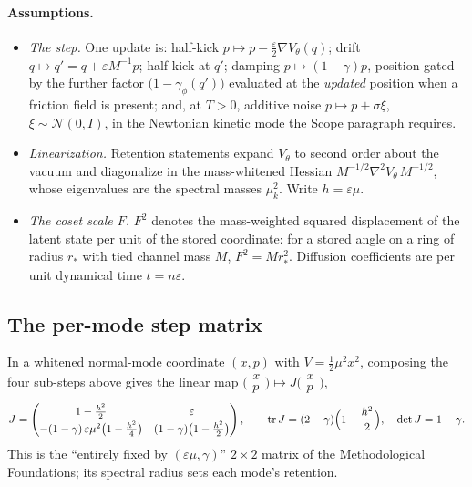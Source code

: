 \documentclass{article}
\begin{document}
\paragraph{Assumptions.}
\begin{itemize}
\item \emph{The step.} One update is: half-kick $p\mapsto p-\tfrac{\varepsilon}{2}\nabla V_\theta(q)$; drift $q\mapsto q'=q+\varepsilon M^{-1}p$; half-kick at $q'$; damping $p\mapsto(1-\gamma)p$, position-gated by the further factor $\bigl(1-\gamma_\phi(q')\bigr)$ evaluated at the \emph{updated} position when a friction field is present; and, at $T>0$, additive noise $p\mapsto p+\sigma\xi$, $\xi\sim\mathcal N(0,I)$, in the Newtonian kinetic mode the Scope paragraph requires.
\item \emph{Linearization.} Retention statements expand $V_\theta$ to second order about the vacuum and diagonalize in the mass-whitened Hessian $M^{-1/2}\nabla^2V_\theta\,M^{-1/2}$, whose eigenvalues are the spectral masses $\mu_k^2$. Write $h=\varepsilon\mu$.
\item \emph{The coset scale $F$.} $F^2$ denotes the mass-weighted squared displacement of the latent state per unit of the stored coordinate: for a stored angle on a ring of radius $r_*$ with tied channel mass $M$, $F^2=M r_*^2$. Diffusion coefficients are per unit dynamical time $t=n\varepsilon$.
\end{itemize}

\subsection{The per-mode step matrix}\label{app:deriv:1} In a whitened normal-mode coordinate $(x,p)$ with $V=\tfrac12\mu^2x^2$, composing the four sub-steps above gives the linear map $\bigl(\begin{smallmatrix}x\\p\end{smallmatrix}\bigr)\mapsto J\bigl(\begin{smallmatrix}x\\p\end{smallmatrix}\bigr)$,
\[
J=\begin{pmatrix}1-\tfrac{h^2}{2} & \varepsilon\\[2pt] -(1-\gamma)\,\varepsilon\mu^2\bigl(1-\tfrac{h^2}{4}\bigr) & (1-\gamma)\bigl(1-\tfrac{h^2}{2}\bigr)\end{pmatrix},
\qquad
\operatorname{tr}J=(2-\gamma)\Bigl(1-\frac{h^2}{2}\Bigr),\quad \det J=1-\gamma .
\]
This is the ``entirely fixed by $(\varepsilon\mu,\gamma)$'' $2\times2$ matrix of the Methodological Foundations; its spectral radius sets each mode's retention.
\end{document}
